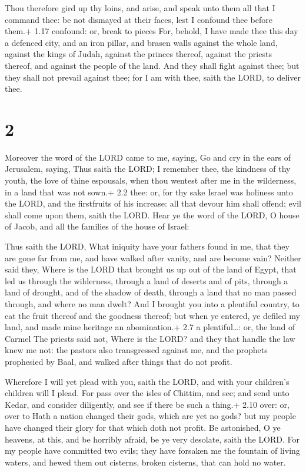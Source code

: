  Thou therefore gird up thy loins, and arise, and speak
unto them all that I command thee: be not dismayed at their faces, lest
I confound thee before them.+ 1.17 confound: or, break to pieces
 For, behold, I have made thee this day a defenced city,
and an iron pillar, and brasen walls against the whole land, against the
kings of Judah, against the princes thereof, against the priests
thereof, and against the people of the land.  And they
shall fight against thee; but they shall not prevail against thee; for I
am with thee, saith the LORD, to deliver thee.

\hypertarget{section-1}{%
\section{2}\label{section-1}}

 Moreover the word of the LORD came to me, saying,
 Go and cry in the ears of Jerusalem, saying, Thus saith the
LORD; I remember thee, the kindness of thy youth, the love of thine
espousals, when thou wentest after me in the wilderness, in a land that
was not sown.+ 2.2 thee: or, for thy sake  Israel was
holiness unto the LORD, and the firstfruits of his increase: all that
devour him shall offend; evil shall come upon them, saith the LORD.
 Hear ye the word of the LORD, O house of Jacob, and all the
families of the house of Israel:

 Thus saith the LORD, What iniquity have your fathers
found in me, that they are gone far from me, and have walked after
vanity, and are become vain?  Neither said they, Where is
the LORD that brought us up out of the land of Egypt, that led us
through the wilderness, through a land of deserts and of pits, through a
land of drought, and of the shadow of death, through a land that no man
passed through, and where no man dwelt?  And I brought you
into a plentiful country, to eat the fruit thereof and the goodness
thereof; but when ye entered, ye defiled my land, and made mine heritage
an abomination.+ 2.7 a plentiful\ldots: or, the land of Carmel
 The priests said not, Where is the LORD? and they that
handle the law knew me not: the pastors also transgressed against me,
and the prophets prophesied by Baal, and walked after things that do not
profit.

 Wherefore I will yet plead with you, saith the LORD, and
with your children's children will I plead.  For pass over
the isles of Chittim, and see; and send unto Kedar, and consider
diligently, and see if there be such a thing.+ 2.10 over: or, over to
 Hath a nation changed their gods, which are yet no gods?
but my people have changed their glory for that which doth not profit.
 Be astonished, O ye heavens, at this, and be horribly
afraid, be ye very desolate, saith the LORD.  For my people
have committed two evils; they have forsaken me the fountain of living
waters, and hewed them out cisterns, broken cisterns, that can hold no
water.

